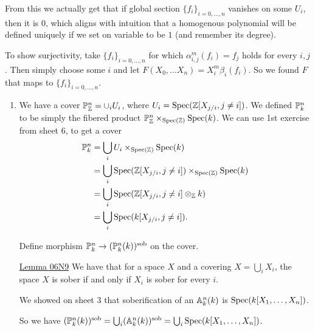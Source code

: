 \begin{exercise}{2}
    From this we actually get that if global section $\{f_i\}_{i = 0, \dots, n}$
    vanishes on some $U_i$, then it is $0$, which aligns with intuition that a
    homogenous polynomial will be defined uniquely if we set on variable to be
    $1$ (and remember its degree).

    To show surjectivity, take $\{f_i\}_{i = 0, \dots, n}$ for which
    $\alpha^m_{i, j} (f_i) = f_j$ holds for every $i, j$. Then simply choose
    some $i$ and let $F(X_0, \dots X_n) = X^m_i \beta_i(f_i)$. So we found $F$
    that maps to $\{f_i\}_{i = 0, \dots, n}$.
\end{exercise}

\begin{exercise}{3}
    \begin{enumerate}
        \item{
            We have a cover $\mathbb{P}^n_{\mathbb{Z}} = \cup_i U_i$, where $U_i = \operatorname{Spec}(\mathbb{Z}[X_{j/i}, j
            \not= i])$. We defined $\mathbb{P}^n_k$ to be simply the fibered product
            $\mathbb{P}^n_{\mathbb{Z}} \times_{\operatorname{Spec}(\mathbb{Z})} \operatorname{Spec}(k)$. We can use 1st exercise from sheet
            6, to get a cover
            \begin{align*}
                \mathbb{P}^n_k &= \bigcup_i U_i \times_{\operatorname{Spec}(\mathbb{Z})} \operatorname{Spec}(k) \\
                &= \bigcup_i \operatorname{Spec}(\mathbb{Z}[X_{j/i}, j \not= i]) \times_{\operatorname{Spec}(\mathbb{Z})} \operatorname{Spec}(k) \\
                &= \bigcup_i \operatorname{Spec}(\mathbb{Z}[X_{j/i}, j \not= i] \otimes_{\mathbb{Z}} k) \\
                &= \bigcup_i \operatorname{Spec}(k[X_{j/i}, j \not= i]).
            \end{align*}

            Define morphism $\mathbb{P}^n_k \to (\mathbb{P}^n_k(k))^{\text{sob}}$ on the
            cover.


            \href{https://stacks.math.columbia.edu/tag/06N9}{Lemma 06N9}
            We have that for a space $X$ and a covering $X = \bigcup_i X_i$, the
            space $X$ is sober if and only if $X_i$ is sober for every $i$.

            We showed on sheet 3 that soberification of an $\mathbb{A}^n_k(k)$ is
            $\operatorname{Spec}(k[X_1, \dots, X_n])$.
            
            So we have $(\mathbb{P}^n_k(k))^{\text{sob}} = \bigcup_i
            (\mathbb{A}^n_k(k))^{\text{sob}} = \bigcup_i \operatorname{Spec}(k[X_1, \dots, X_n])$.

}
\end{enumerate}
\end{exercise}
